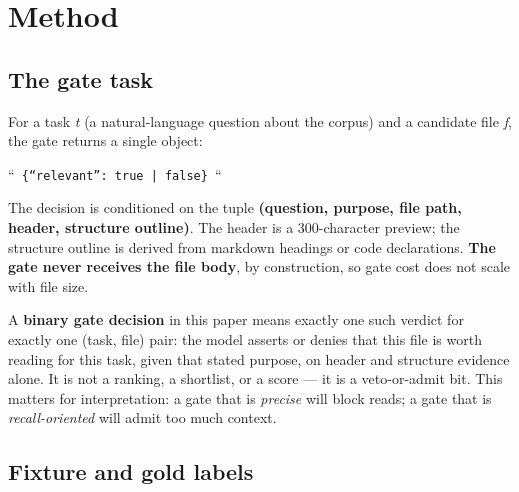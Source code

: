 \documentclass[10pt]{article}
\begin{document}
\section{Method}

\subsection{The gate task}

For a task \emph{t} (a natural-language question about the corpus) and a candidate file \emph{f}, the gate returns a single object:

``\texttt{ \{``relevant'': true | false\} }``

The decision is conditioned on the tuple \textbf{(question, purpose, file path, header, structure outline)}. The header is a 300-character preview; the structure outline is derived from markdown headings or code declarations. \textbf{The gate never receives the file body}, by construction, so gate cost does not scale with file size.

A \textbf{binary gate decision} in this paper means exactly one such verdict for exactly one (task, file) pair: the model asserts or denies that this file is worth reading for this task, given that stated purpose, on header and structure evidence alone. It is not a ranking, a shortlist, or a score --- it is a veto-or-admit bit. This matters for interpretation: a gate that is \emph{precise} will block reads; a gate that is \emph{recall-oriented} will admit too much context.

\subsection{Fixture and gold labels}
\end{document}
